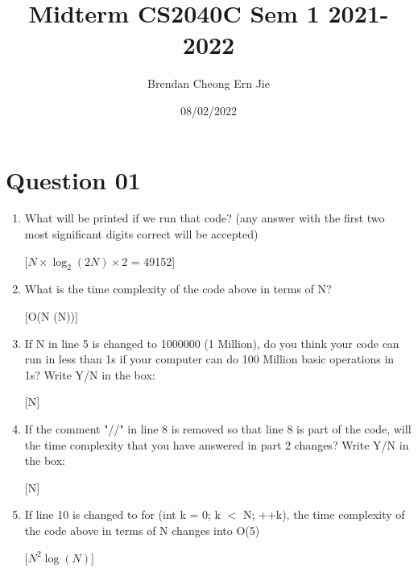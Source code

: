 \documentclass{article}
\title{Midterm CS2040C Sem 1 2021-2022}
\author{Brendan Cheong Ern Jie}
\date {08/02/2022}
\begin{document}
\maketitle

\section{Question 01}
\begin{enumerate}[label=(\arabic*)]
\item What will be printed if we run that code? (any answer with the first two most significant digits correct will be accepted)

[$N \times \log_2(2N) \times 2$    = 49152]

\item What is the time complexity of the code above in terms of N?

[O(N \log(N))]

\item If N in line 5 is changed to 1000000 (1 Million), do you think your code can run in less
than 1s if your computer can do 100 Million basic operations in 1s? Write Y/N in the
box:

[N]

\item If the comment "//" in line 8 is removed so that line 8 is part of the code, will the time
complexity that you have answered in part 2 changes? Write Y/N in the box:

[N]

\item  If line 10 is changed to for (int k = 0; k $<$ N; ++k), the time complexity of the code
above in terms of N changes into O(5) 

[$N^2\log(N)$]

\end{enumerate}
\end{document}
